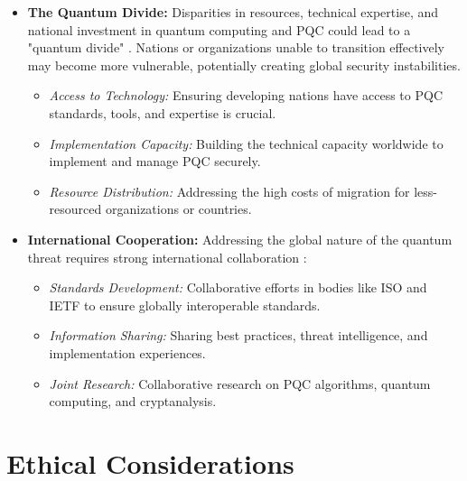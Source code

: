 \begin{itemize}
    \item \textbf{The Quantum Divide:} Disparities in resources, technical expertise, and national investment in quantum computing and PQC could lead to a "quantum divide" \parencite{quantum_divide_report}. Nations or organizations unable to transition effectively may become more vulnerable, potentially creating global security instabilities.
    \begin{itemize}
        \item \textit{Access to Technology:} Ensuring developing nations have access to PQC standards, tools, and expertise is crucial.
        \item \textit{Implementation Capacity:} Building the technical capacity worldwide to implement and manage PQC securely.
        \item \textit{Resource Distribution:} Addressing the high costs of migration for less-resourced organizations or countries.
    \end{itemize}
    \item \textbf{International Cooperation:} Addressing the global nature of the quantum threat requires strong international collaboration \parencite{pqc_standards_cooperation}:
    \begin{itemize}
        \item \textit{Standards Development:} Collaborative efforts in bodies like ISO and IETF to ensure globally interoperable standards.
        \item \textit{Information Sharing:} Sharing best practices, threat intelligence, and implementation experiences.
        \item \textit{Joint Research:} Collaborative research on PQC algorithms, quantum computing, and cryptanalysis.
    \end{itemize}
\end{itemize}

\section{Ethical Considerations}\label{sec:ethics_ch9}


